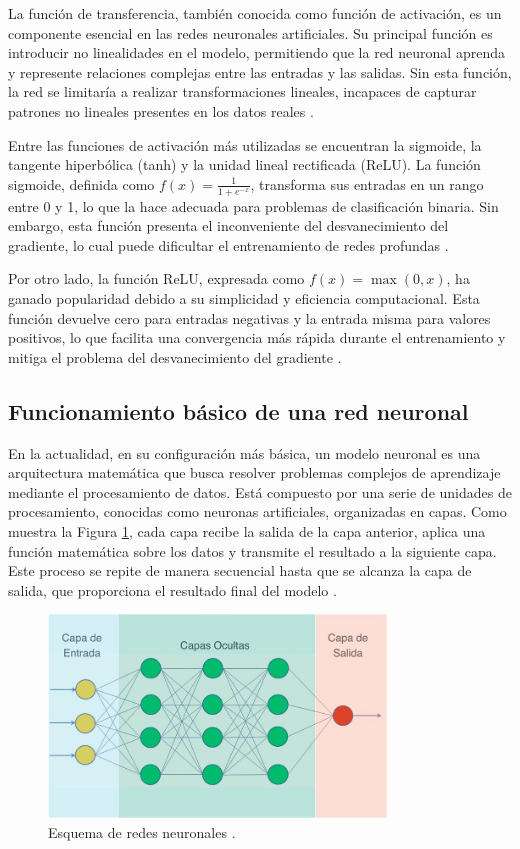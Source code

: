 La función de transferencia, también conocida como función de activación, es un componente esencial en las redes neuronales artificiales. Su principal función es introducir no linealidades en el modelo, permitiendo que la red neuronal aprenda y represente relaciones complejas entre las entradas y las salidas. Sin esta función, la red se limitaría a realizar transformaciones lineales, incapaces de capturar patrones no lineales presentes en los datos reales \cite{lederer2021activation}.

Entre las funciones de activación más utilizadas se encuentran la sigmoide, la tangente hiperbólica (tanh) y la unidad lineal rectificada (ReLU). La función sigmoide, definida como \( f(x) = \frac{1}{1 + e^{-x}} \), transforma sus entradas en un rango entre 0 y 1, lo que la hace adecuada para problemas de clasificación binaria. Sin embargo, esta función presenta el inconveniente del desvanecimiento del gradiente, lo cual puede dificultar el entrenamiento de redes profundas \cite{dubey2021activation}.

Por otro lado, la función ReLU, expresada como \( f(x) = \max(0, x) \), ha ganado popularidad debido a su simplicidad y eficiencia computacional. Esta función devuelve cero para entradas negativas y la entrada misma para valores positivos, lo que facilita una convergencia más rápida durante el entrenamiento y mitiga el problema del desvanecimiento del gradiente \cite{ramachandran2017searching}.


\subsection{Funcionamiento básico de una red neuronal}
En la actualidad, en su configuración más básica, un modelo neuronal es una arquitectura matemática que busca resolver problemas complejos de aprendizaje mediante el procesamiento de datos. Está compuesto por una serie de unidades de procesamiento, conocidas como neuronas artificiales, organizadas en capas. Como muestra la Figura \ref{fig:esq-capas}, cada capa recibe la salida de la capa anterior, aplica una función matemática sobre los datos y transmite el resultado a la siguiente capa. Este proceso se repite de manera secuencial hasta que se alcanza la capa de salida, que proporciona el resultado final del modelo \cite{bishop2006pattern}.

\begin{figure}[H]
    \centering
    \includegraphics[width=0.8\textwidth]{./img/modelo/capas.png}
    \caption{Esquema de redes neuronales \cite{aprendeia2021deep}.}
    \label{fig:esq-capas}
\end{figure}

